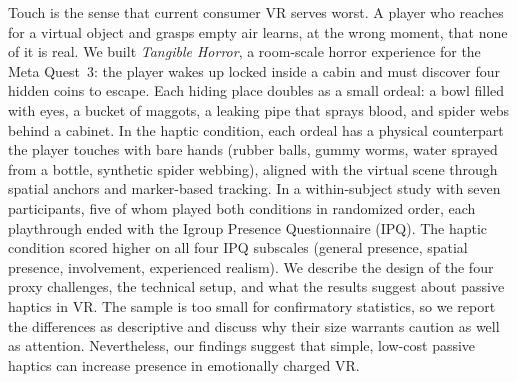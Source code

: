 
Touch is the sense that current consumer VR serves worst. A player who reaches for a virtual object and grasps empty air learns, at the wrong moment, that none of it is real. We built \emph{Tangible Horror}, a room-scale horror experience for the Meta Quest~3: the player wakes up locked inside a cabin and must discover four hidden coins to escape. Each hiding place doubles as a small ordeal: a bowl filled with eyes, a bucket of maggots, a leaking pipe that sprays blood, and spider webs behind a cabinet. In the haptic condition, each ordeal has a physical counterpart the player touches with bare hands (rubber balls, gummy worms, water sprayed from a bottle, synthetic spider webbing), aligned with the virtual scene through spatial anchors and marker-based tracking. In a within-subject study with seven participants, five of whom played both conditions in randomized order, each playthrough ended with the Igroup Presence Questionnaire (IPQ). The haptic condition scored higher on all four IPQ subscales (general presence, spatial presence, involvement, experienced realism). We describe the design of the four proxy challenges, the technical setup, and what the results suggest about passive haptics in VR. The sample is too small for confirmatory statistics, so we report the differences as descriptive and discuss why their size warrants caution as well as attention. Nevertheless, our findings suggest that simple, low-cost passive haptics can increase presence in emotionally charged VR.

